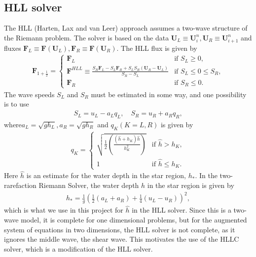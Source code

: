 \subsection{HLL solver}
The HLL (Harten, Lax and van Leer) approach assumes a two-wave structure of the Riemann problem.
The solver is based on the data $\mathbf{U}_L \equiv \mathbf{U}_i^n, \mathbf{U}_R \equiv \mathbf{U}_{i+1}^n$ and fluxes $\mathbf{F}_L \equiv \mathbf{F}(\mathbf{U}_L), \mathbf{F}_R \equiv \mathbf{F}(\mathbf{U}_R)$.
The HLL flux is given by
\begin{align}\label{eq:HLL_flux}
    \mathbf{F}_{1 + \frac{1}{2}} = \begin{cases}
        \mathbf{F}_L & \text{if } S_L \geq 0, \\
        \mathbf{F}^{HLL} \equiv \frac{S_R \mathbf{F}_L - S_L \mathbf{F}_R + S_L S_R (\mathbf{U}_R - \mathbf{U}_L)}{S_R - S_L} & \text{if } S_L \leq 0 \leq S_R, \\
        \mathbf{F}_R & \text{if } S_R \leq 0.
    \end{cases}
\end{align}
The wave speeds $S_L$ and $S_R$ must be estimated in some way, and one possibility is to use 
\begin{align*}
    S_L = u_L - a_L q_L, \quad S_R = u_R + a_R q_R,
\end{align*}
where$a_L = \sqrt{g h_L}, a_R = \sqrt{g h_R}$ and  $q_K (K=L, R)$ is given by 
\begin{align*}
    q_K = 
    \begin{cases}
        \sqrt{\frac{1}{2}\left( \frac{(\hat{h} + h_K) \hat{h}}{h_K^2} \right) } & \text{if } \hat{h} > h_K, \\
        1 & \text{if } \hat{h} \leq h_K.
    \end{cases}
\end{align*}
Here $\hat{h}$ is an estimate for the water depth in the star region, $h_*$.
In the two-rarefaction Riemann Solver, the water depth $h$ in the star region is given by
\begin{align}\label{eq:two_rarefaction_hstar}
    h_* = \frac{1}{g} {\left( \frac{1}{2} (a_L + a_R) + \frac{1}{4} (u_L - u_R)  \right)}^2,
\end{align}
which is what we use in this project for $\hat{h}$ in the HLL solver.
Since this is a two-wave model, it is complete for one dimensional problems, but for the augmented system of equations in two dimensions, the HLL solver is not complete, as it ignores the middle wave, the shear wave.
This motivates the use of the HLLC solver, which is a modification of the HLL solver.


